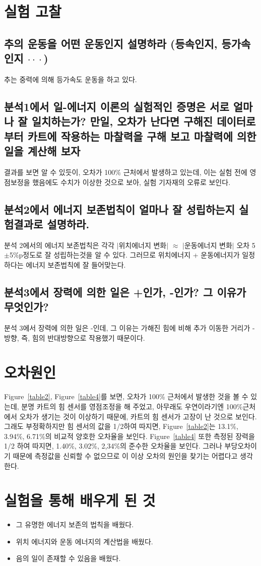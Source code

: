 \documentclass[12pt,a4paper]{article}
\begin{document}
\section{실험 고찰}
\subsection{추의 운동을 어떤 운동인지 설명하라 (등속인지, 등가속인지
    $\cdot\!\cdot\!\cdot$)}
    추는 중력에 의해 등가속도 운동을 하고 있다.
\subsection{분석1에서 일-에너지 이론의 실험적인 증명은 서로 얼마나 잘 일치하는가?
    만일, 오차가 난다면 구해진 데이터로부터 카트에 작용하는 마찰력을 구해 보고
    마찰력에 의한 일을 계산해 보자}
결과를 보면 알 수 있듯이, 오차가 100\% 근처에서 발생하고 있는데, 이는 실험 전에
영점보정을 했음에도 수치가 이상한 것으로 보아, 실험 기자재의 오류로 보인다.
\subsection{분석2에서 에너지 보존법칙이 얼마나 잘 성립하는지 실험결과로 설명하라.}
분석 2에서의 에너지 보존법칙은 각각 $|$위치에너지 변화$|$ $\approx$
$|$운동에너지 변화$|$ 오차 5$\pm$5\%p정도로 잘 성립하는것을 알 수 있다.
그러므로 위치에너지 + 운동에너지가 일정하다는 에너지 보존법칙에 잘 들어맞는다.
\subsection{분석3에서 장력에 의한 일은 +인가, -인가? 그 이유가 무엇인가?}
분석 3에서 장력에 의한 일은 -인데, 그 이유는 가해진 힘에 비해 추가 이동한 거리가
-방향, 즉, 힘의 반대방향으로 작용했기 때문이다. 
\section{오차원인}
Figure~\ref{table2}, Figure~\ref{table4}를 보면, 오차가 100\% 근처에서 발생한 것을
볼 수 있는데, 분명 카트의 힘 센서를 영점조정을 해 주었고, 아무래도 우연이라기엔
100\%근처에서 오차가 생기는 것이 이상하기 때문에, 카트의 힘 센서가 고장이 난 것으로
보인다. 그래도 부정확하지만 힘 센서의 값을 1/2하여 따지면, Figure~\ref{table2}는
13.1\%, 3.94\%, 6.71\%의 비교적 양호한 오차율을 보인다. Figure~\ref{table4}
또한 측정된 장력을 1/2 하여 따지면, 1.40\%, 3.02\%, 2,34\%의 준수한 오차율을 보인다.
그러나 부당오차이기 때문에 측정값을 신뢰할 수 없으므로 이 이상 오차의 원인을 찾기는
어렵다고 생각한다.
\section{실험을 통해 배우게 된 것}
\begin{itemize}
    \item 그 유명한 에너지 보존의 법칙을 배웠다.
    \item 위치 에너지와 운동 에너지의 계산법을 배웠다.
    \item 음의 일이 존재할 수 있음을 배웠다.
\end{itemize}
\end{document}
